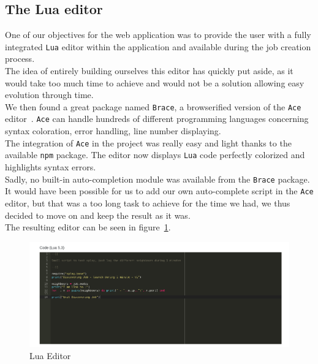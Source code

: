 \documentclass{eplmastersthesis}
\begin{document}
        \subsection{The Lua editor}

          One of our objectives for the web application was to provide the user
          with a fully integrated \texttt{Lua} editor within the application and
          available during the job creation process.\\
          The idea of entirely building ourselves this editor has quickly
          put aside, as it would take too much time to achieve and would not
          be a solution allowing easy evolution through time.\\
          We then found a great package named \texttt{Brace}, a browserified
          version of the \texttt{Ace} editor~\cite{Ace}. \texttt{Ace} can handle hundreds of
          different programming languages concerning syntax coloration,
          error handling, line number displaying.\\

          The integration of \texttt{Ace} in the project was really easy and light thanks
          to the available \texttt{npm} package. The editor now displays \texttt{Lua} code
          perfectly colorized and highlights syntax errors.\\

          Sadly, no built-in auto-completion module was available from the
          \texttt{Brace} package. It would have been possible for us to add our own
          auto-complete script in the \texttt{Ace} editor, but that was a too long
          task to achieve for the time we had, we thus decided to move on and
          keep the result as it was.\\

          The resulting editor can be seen in figure~\ref{luaeditor}.

          \begin{figure}
            \centering
            \includegraphics[scale=0.55]{figures/luaeditor.png}
            \caption{\label{luaeditor} Lua Editor}
          \end{figure}
\end{document}
